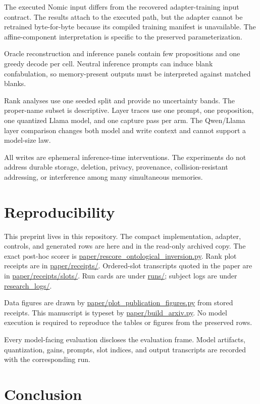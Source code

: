 \documentclass[11pt]{article}
\begin{document}
The executed Nomic input differs from the recovered adapter-training input
contract. The results attach to the executed path, but the adapter cannot be
retrained byte-for-byte because its compiled training manifest is unavailable.
The affine-component interpretation is specific to the preserved
parameterization.

Oracle reconstruction and inference panels contain few propositions and one greedy
decode per cell. Neutral inference prompts can induce blank confabulation, so
memory-present outputs must be interpreted against matched blanks.

Rank analyses use one seeded split and provide no uncertainty bands. The
proper-name subset is descriptive. Layer traces use one prompt, one proposition,
one quantized Llama model, and one capture pass per arm. The Qwen/Llama layer
comparison changes both model and write context and cannot support a
model-size law.

All writes are ephemeral inference-time interventions. The experiments do not
address durable storage, deletion, privacy, provenance, collision-resistant
addressing, or interference among many simultaneous memories.

\section{Reproducibility}


This preprint lives in this repository. The compact implementation, adapter,
controls, and generated rows are here and in the read-only archived copy.
The exact post-hoc scorer is \url{paper/rescore_ontological_inversion.py}. Rank
plot receipts are in \url{paper/receipts/}. Ordered-slot transcripts quoted in
the paper are in \url{paper/receipts/slots/}. Run cards are under \url{runs/};
subject logs are under \url{research_logs/}.

Data figures are drawn by \url{paper/plot_publication_figures.py} from stored
receipts. This manuscript is typeset by \url{paper/build_arxiv.py}. No model
execution is required to reproduce the tables or figures from the preserved
rows.

Every model-facing evaluation discloses the evaluation frame. Model artifacts,
quantization, gains, prompts, slot indices, and output transcripts are recorded
with the corresponding run.

\section{Conclusion}
\end{document}

